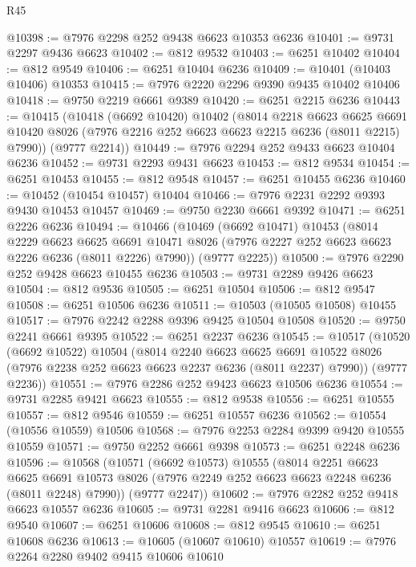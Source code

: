 \begin{lexlean}{R45}
\begin{coremodule}
{@10398 := @7976 @2298 @252 @9438 @6623 @10353 @6236
@10401 := @9731 @2297 @9436 @6623
@10402 := @812 @9532
@10403 := @6251 @10402
@10404 := @812 @9549
@10406 := @6251 @10404 @6236
@10409 := @10401 (@10403 @10406) @10353
@10415 := @7976 @2220 @2296 @9390 @9435 @10402 @10406
@10418 := @9750 @2219 @6661 @9389
@10420 := @6251 @2215 @6236
@10443 := @10415
    (@10418
      (@6692 @10420)
      @10402
      (@8014
        @2218
        @6623
        @6625
        @6691
        @10420
        @8026
        (@7976 @2216 @252 @6623 @6623 @2215 @6236 (@8011 @2215) @7990))
      (@9777 @2214))
@10449 := @7976 @2294 @252 @9433 @6623 @10404 @6236
@10452 := @9731 @2293 @9431 @6623
@10453 := @812 @9534
@10454 := @6251 @10453
@10455 := @812 @9548
@10457 := @6251 @10455 @6236
@10460 := @10452 (@10454 @10457) @10404
@10466 := @7976 @2231 @2292 @9393 @9430 @10453 @10457
@10469 := @9750 @2230 @6661 @9392
@10471 := @6251 @2226 @6236
@10494 := @10466
    (@10469
      (@6692 @10471)
      @10453
      (@8014
        @2229
        @6623
        @6625
        @6691
        @10471
        @8026
        (@7976 @2227 @252 @6623 @6623 @2226 @6236 (@8011 @2226) @7990))
      (@9777 @2225))
@10500 := @7976 @2290 @252 @9428 @6623 @10455 @6236
@10503 := @9731 @2289 @9426 @6623
@10504 := @812 @9536
@10505 := @6251 @10504
@10506 := @812 @9547
@10508 := @6251 @10506 @6236
@10511 := @10503 (@10505 @10508) @10455
@10517 := @7976 @2242 @2288 @9396 @9425 @10504 @10508
@10520 := @9750 @2241 @6661 @9395
@10522 := @6251 @2237 @6236
@10545 := @10517
    (@10520
      (@6692 @10522)
      @10504
      (@8014
        @2240
        @6623
        @6625
        @6691
        @10522
        @8026
        (@7976 @2238 @252 @6623 @6623 @2237 @6236 (@8011 @2237) @7990))
      (@9777 @2236))
@10551 := @7976 @2286 @252 @9423 @6623 @10506 @6236
@10554 := @9731 @2285 @9421 @6623
@10555 := @812 @9538
@10556 := @6251 @10555
@10557 := @812 @9546
@10559 := @6251 @10557 @6236
@10562 := @10554 (@10556 @10559) @10506
@10568 := @7976 @2253 @2284 @9399 @9420 @10555 @10559
@10571 := @9750 @2252 @6661 @9398
@10573 := @6251 @2248 @6236
@10596 := @10568
    (@10571
      (@6692 @10573)
      @10555
      (@8014
        @2251
        @6623
        @6625
        @6691
        @10573
        @8026
        (@7976 @2249 @252 @6623 @6623 @2248 @6236 (@8011 @2248) @7990))
      (@9777 @2247))
@10602 := @7976 @2282 @252 @9418 @6623 @10557 @6236
@10605 := @9731 @2281 @9416 @6623
@10606 := @812 @9540
@10607 := @6251 @10606
@10608 := @812 @9545
@10610 := @6251 @10608 @6236
@10613 := @10605 (@10607 @10610) @10557
@10619 := @7976 @2264 @2280 @9402 @9415 @10606 @10610
}
\end{coremodule}
\end{lexlean}
